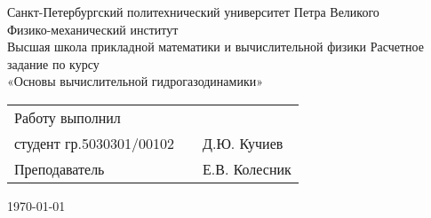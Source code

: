\begin{center}
\thispagestyle{empty}
Санкт-Петербургский политехнический университет Петра Великого \\
Физико-механический институт \\
Высшая школа прикладной математики и вычислительной физики
\vfill
\huge{Расчетное задание по курсу \\ «Основы вычислительной гидрогазодинамики»}
\vfill

\normalsize

\mbox{}\hfill
\begin{tabular}{lp{5em}l}
Работу выполнил & & \\
студент гр.5030301/00102 & & Д.Ю. Кучиев\\[2ex]
Преподаватель & & Е.В. Колесник \\
\end{tabular}
\vfill \today
\end{center}